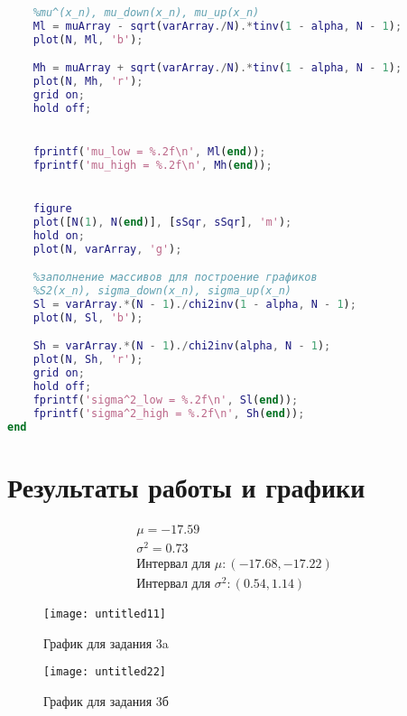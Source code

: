 \begin{lstlisting}[language=Matlab, caption=Текст программы]
	%заполнение массивов для построение графиков 
	%mu^(x_n), mu_down(x_n), mu_up(x_n) 
	Ml = muArray - sqrt(varArray./N).*tinv(1 - alpha, N - 1);
	plot(N, Ml, 'b');

	Mh = muArray + sqrt(varArray./N).*tinv(1 - alpha, N - 1);
	plot(N, Mh, 'r');
	grid on;
	hold off;


	fprintf('mu_low = %.2f\n', Ml(end));
	fprintf('mu_high = %.2f\n', Mh(end));


	figure
	plot([N(1), N(end)], [sSqr, sSqr], 'm');
	hold on;
	plot(N, varArray, 'g');

	%заполнение массивов для построение графиков 
	%S2(x_n), sigma_down(x_n), sigma_up(x_n)  
	Sl = varArray.*(N - 1)./chi2inv(1 - alpha, N - 1);
	plot(N, Sl, 'b');	

	Sh = varArray.*(N - 1)./chi2inv(alpha, N - 1);
	plot(N, Sh, 'r');
	grid on;
	hold off;
	fprintf('sigma^2_low = %.2f\n', Sl(end));
	fprintf('sigma^2_high = %.2f\n', Sh(end));
end
\end{lstlisting}

\section*{Результаты работы и графики}

\begin{align}
\mu = -17.59\\
\sigma^2 = 0.73\\
\text{Интервал для }\mu: (-17.68,-17.22) \\ \nonumber
\text{Интервал для }\sigma^2: (0.54,1.14) 
\end{align}

\begin{figure}[h!]
\center\texttt{[image: untitled11]}
\caption{График для задания 3a}
\label{fig:image}
\end{figure}

\begin{figure}[h!]
	\center\texttt{[image: untitled22]}
	\caption{График для задания 3б}
	\label{fig:image1}
\end{figure}